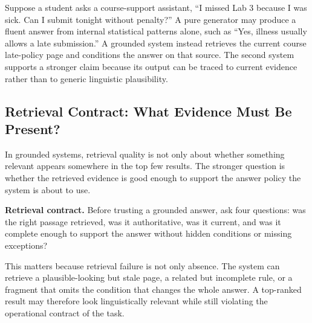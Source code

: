 \begin{example}
Suppose a student asks a course-support assistant, ``I missed Lab 3 because I was sick. Can I submit tonight without penalty?'' A pure generator may produce a fluent answer from internal statistical patterns alone, such as ``Yes, illness usually allows a late submission.'' A grounded system instead retrieves the current course late-policy page and conditions the answer on that source. The second system supports a stronger claim because its output can be traced to current evidence rather than to generic linguistic plausibility.
\end{example}

\subsection{Retrieval Contract: What Evidence Must Be Present?}

In grounded systems, retrieval quality is not only about whether something relevant appears somewhere in the top few results. The stronger question is whether the retrieved evidence is good enough to support the answer policy the system is about to use.

\begin{thinkingtool}
\textbf{Retrieval contract.} Before trusting a grounded answer, ask four questions: was the right passage retrieved, was it authoritative, was it current, and was it complete enough to support the answer without hidden conditions or missing exceptions?
\end{thinkingtool}

This matters because retrieval failure is not only absence. The system can retrieve a plausible-looking but stale page, a related but incomplete rule, or a fragment that omits the condition that changes the whole answer. A top-ranked result may therefore look linguistically relevant while still violating the operational contract of the task.

